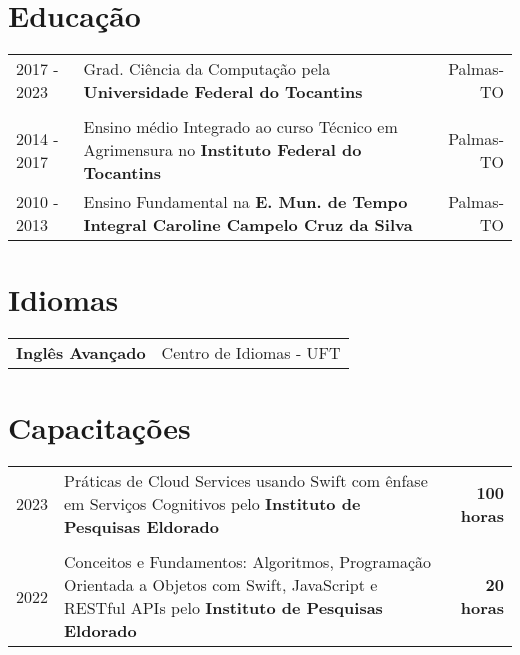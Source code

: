 \documentclass[a4paper,12pt]{article}
\begin{document}
\section{Educação}
\begin{tabularx}{\linewidth}{lXr}	
2017 - 2023 & Grad. Ciência da Computação pela \textbf{Universidade Federal do Tocantins} & Palmas-TO \\\\

2014 - 2017 & Ensino médio Integrado ao curso Técnico em Agrimensura no \textbf{Instituto Federal do Tocantins} & Palmas-TO \\ 

2010 - 2013 & Ensino Fundamental na \textbf{E. Mun. de Tempo Integral Caroline Campelo Cruz da Silva} & Palmas-TO \\ 
\end{tabularx}


\section{Idiomas}
\begin{tabularx}{\linewidth}{@{}l X@{}}
\textbf{Inglês Avançado} & \hfill Centro de Idiomas - UFT \\
\end{tabularx}

\section{Capacitações}
\begin{tabularx}{\linewidth}{lXr}	
2023 & Práticas de Cloud Services usando Swift com ênfase em Serviços Cognitivos pelo \textbf{Instituto de Pesquisas Eldorado} & \textbf{100 horas}\\\\

2022 & Conceitos e Fundamentos: Algoritmos, Programação Orientada a Objetos com Swift, JavaScript e RESTful APIs pelo \textbf{Instituto de Pesquisas Eldorado} & \textbf{20 horas}\\ 
\end{tabularx}
\end{document}

